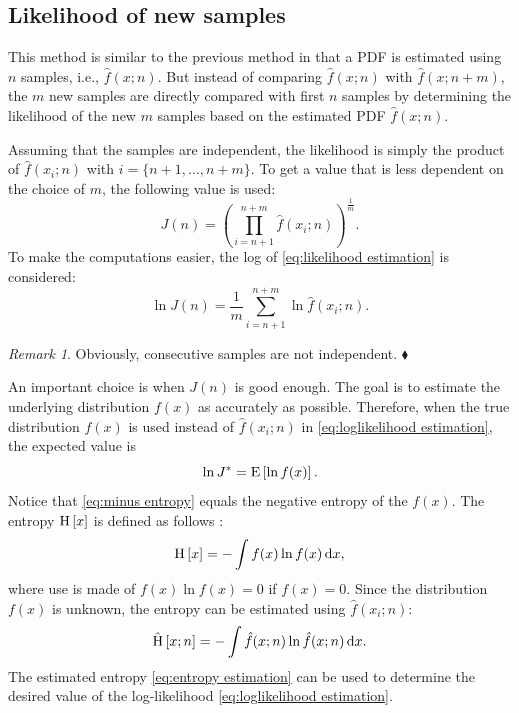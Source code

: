 \documentclass[10pt,final,a4paper,oneside,onecolumn]{article}
\newcommand*{\ud}{\mathrm{\,d}}                                 %
\newcommand{\expectation}[1]{\textup{E} \left[ #1 \right]}
\newcommand{\entropy}[1]{\textup{H} \left[ #1 \right]}
\newcommand{\hatentropy}[1]{\hat{\textup{H}} \left[ #1 \right]}
\theoremstyle{plain}\newtheorem{definition}{Definition}[section]    %
\theoremstyle{definition}\newtheorem{example}{Example}[section]     %
\theoremstyle{remark}\newtheorem{remarkenv}{Remark}[section]        %
\newenvironment{remark}{\begin{remarkenv}}%
                       {\hfill$\blacklozenge$\end{remarkenv}}       %
\begin{document}
\subsection{Likelihood of new samples}
\label{sec:likelihood sample based}

This method is similar to the previous method in that a PDF is estimated using $n$ samples, i.e., $\hat{f}(x;n)$. But instead of comparing $\hat{f}(x;n)$ with $\hat{f}(x;n+m)$, the $m$ new samples are directly compared with first $n$ samples by determining the likelihood of the new $m$ samples based on the estimated PDF $\hat{f}(x;n)$. 

Assuming that the samples are independent, the likelihood is simply the product of $\hat{f}(x_i;n)$ with $i=\{n+1, \ldots, n+m\}$. To get a value that is less dependent on the choice of $m$, the following value is used:
\begin{equation} \label{eq:likelihood estimation}
	J(n) = \left( \prod_{i=n+1}^{n+m} \hat{f}(x_i;n) \right)^{\frac{1}{m}}.
\end{equation}
To make the computations easier, the log of \cref{eq:likelihood estimation} is considered:
\begin{equation} \label{eq:loglikelihood estimation}
	\ln J(n) = \frac{1}{m} \sum_{i=n+1}^{n+m} \ln \hat{f}(x_i;n).
\end{equation}

\begin{remark}
	Obviously, consecutive samples are not independent.
\end{remark}

An important choice is when $J(n)$ is good enough. The goal is to estimate the underlying distribution $f(x)$ as accurately as possible. Therefore, when the true distribution $f(x)$ is used instead of $\hat{f}(x_i;n)$ in \cref{eq:loglikelihood estimation}, the expected value is
\begin{equation} \label{eq:minus entropy}
	\ln J^* = \expectation{ \ln f(x) }.
\end{equation}
Notice that \cref{eq:minus entropy} equals the negative entropy of the $f(x)$. The entropy $\entropy{x}$ is defined as follows \cite{bishop2006pattern}:
\begin{equation} \label{eq:entropy}
	\entropy{x} = -\int f(x) \ln f(x) \ud x,
\end{equation}
where use is made of $f(x) \ln f(x) = 0$ if $f(x)=0$. Since the distribution $f(x)$ is unknown, the entropy can be estimated using $\hat{f}(x_i;n)$:
\begin{equation} \label{eq:entropy estimation}
	\hatentropy{x; n} = -\int \hat{f}(x;n) \ln \hat{f}(x;n) \ud x.
\end{equation}
The estimated entropy \cref{eq:entropy estimation} can be used to determine the desired value of the log-likelihood \eqref{eq:loglikelihood estimation}.
\end{document}

